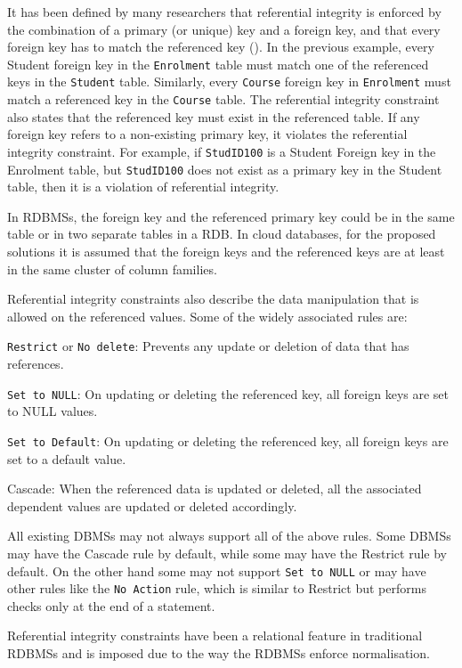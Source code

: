 It has been defined by many researchers that referential integrity is enforced
by the combination of a primary (or unique) key and a foreign key, and that
every foreign key has to match the referenced key (). In the previous
example, every Student foreign key in the \texttt{Enrolment} table must match one of
the referenced keys in the \texttt{Student} table. Similarly, every \texttt{Course} foreign
key in \texttt{Enrolment} must match a referenced key in the \texttt{Course} table. The
referential integrity constraint also states that the referenced key must exist
in the referenced table. If any foreign key refers to a non-existing primary
key, it violates the referential integrity constraint.  For example, if
\texttt{StudID100} is a Student Foreign key in the Enrolment table, but \texttt{StudID100}
does not exist as a primary key in the Student table, then it is a violation of
referential integrity.

 In \acp{RDBMS}, the foreign key and the referenced primary key could be in the same
 table or in two separate tables in a \ac{RDB}. In cloud databases, for the proposed
 solutions it is assumed that the foreign keys and the referenced keys are at
 least in the same cluster of column families.

Referential integrity constraints also describe the data manipulation that is
allowed on the referenced values. Some of the widely associated rules are:

\texttt{Restrict} or \texttt{No delete}: Prevents any update or deletion of data
that has references.

\texttt{Set to NULL}: On updating or deleting the referenced key, all foreign
keys are set to NULL values.

\texttt{Set to Default}: On updating or deleting the referenced key, all foreign
keys are set to a default value.

Cascade: When the referenced data is updated or deleted, all the associated
dependent values are updated or deleted accordingly.

All existing \acp{DBMS} may not always support all of the above rules. Some \acp{DBMS} may
have the Cascade rule by default, while some may have the Restrict rule by
default. On the other hand some may not support \texttt{Set to NULL} or may have other
rules like the \texttt{No Action} rule, which is similar to Restrict but performs
checks only at the end of a statement.

Referential integrity constraints have been a relational feature in traditional
\acp{RDBMS} and is imposed due to the way the \acp{RDBMS} enforce normalisation.


